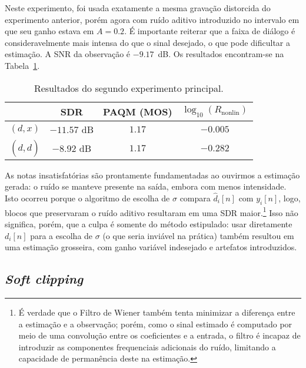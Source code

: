 Neste experimento, foi usada exatamente a mesma gravação distorcida do experimento
anterior, porém agora com ruído aditivo introduzido no intervalo em que seu ganho
estava em $A = 0.2$. É importante reiterar que a faixa de diálogo é consideravelmente
mais intensa do que o sinal desejado, o que pode dificultar a estimação. A SNR da
observação é $-9.17$~dB. Os resultados encontram-se na
Tabela~\ref{tab:correntropy:experiment-2}. {\def\arraystretch{1.25}\tabcolsep=10pt
\begin{table}[!ht]
	\centering
	\caption[Resultados do segundo experimento: \textit{fades} com ruído aditivo]{Resultados do segundo experimento principal.}
	\label{tab:correntropy:experiment-2}
	\begin{tabular}{cccc}
		\toprule
		               & SDR         & PAQM (MOS) & $\log_{10}(R_{\text{nonlin}})$ \\
		\midrule
		$(d, x)$       & $-11.57$ dB & $1.17$     & $-0.005$                       \\
		$(d, \hat{d})$ & $-8.92$ dB  & $1.17$     & $-0.282$                       \\ \bottomrule
	\end{tabular}
\end{table}
}

As notas insatisfatórias são prontamente fundamentadas ao ouvirmos a estimação gerada:
o ruído se manteve presente na saída, embora com menos intensidade. Isto ocorreu porque
o algoritmo de escolha de $\sigma$ compara $\hat{d}_i[n]$ com $y_i[n]$, logo, blocos
que preservaram o ruído aditivo resultaram em uma SDR maior.\footnote{É verdade que o
	Filtro de Wiener também tenta minimizar a diferença entre a estimação e a observação;
	porém, como o sinal estimado é computado por meio de uma convolução entre os
	coeficientes e a entrada, o filtro é incapaz de introduzir as componentes frequenciais
	adicionais do ruído, limitando a capacidade de permanência deste na estimação.} Isso
não significa, porém, que a culpa é somente do método estipulado: usar diretamente
$d_i[n]$ para a escolha de $\sigma$ (o que seria inviável na prática) também resultou
em uma estimação grosseira, com ganho variável indesejado e artefatos introduzidos.

\subsection{\textit{Soft clipping}}

